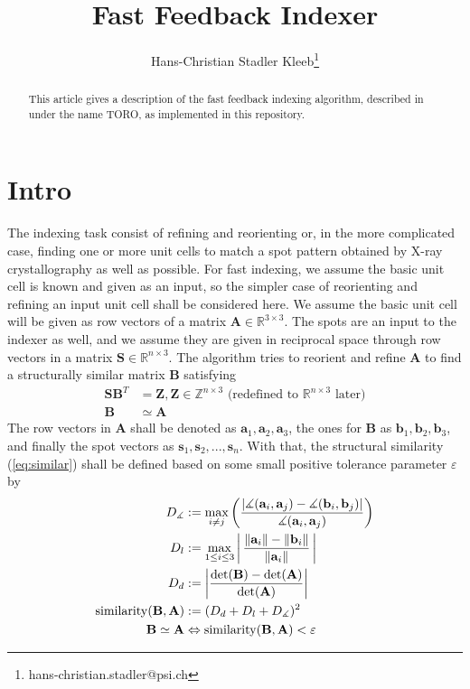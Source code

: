 \documentclass[a4paper,10pt]{article}
\title{Fast Feedback Indexer}
\author{Hans-Christian Stadler Kleeb\thanks{hans-christian.stadler@psi.ch}}
\DeclareMathOperator{\similar}{similarity}
\newcommand{\vect}[1]{\mathbf{#1}}
\newcommand{\mat}[1]{\mathbf{#1}}
\begin{document}
\maketitle

\begin{abstract}
This article gives a description of the fast feedback indexing algorithm, described in \cite{toro-indexer} under the name TORO, as implemented in this repository.
\end{abstract}

\section{Intro}\label{sec:intro}
The indexing task consist of refining and reorienting or, in the more complicated case, finding one or more unit cells to match a spot pattern obtained by X-ray crystallography as well as possible. For fast indexing, we assume the basic unit cell is known and given as an input, so the simpler case of reorienting and refining an input unit cell shall be considered here. We assume the basic unit cell will be given as row vectors of a matrix $\mat{A} \in \mathbb{R}^{3 \times 3}$. The spots are an input to the indexer as well, and we assume they are given in reciprocal space through row vectors in a matrix $\mat{S} \in \mathbb{R}^{n \times 3}$. The algorithm tries to reorient and refine $\mat{A}$ to find a structurally similar matrix $\mat{B}$ satisfying
%
\begin{align}
 \label{eq:integer} \mat{S} \mat{B}^T &= \mat{Z}, \mat{Z} \in \mathbb{Z}^{n \times 3}\text{ (redefined to }\mathbb{R}^{n\times 3}\text{ later)} \\
 \label{eq:similar} \mat{B} &\simeq \mat{A}
\end{align}
%
The row vectors in $\mat{A}$ shall be denoted as $\vect{a}_1,\vect{a}_2,\vect{a}_3$, the ones for $\mat{B}$ as $\vect{b}_1,\vect{b}_2,\vect{b}_3$, and finally the spot vectors as $\vect{s}_1, \vect{s}_2, ..., \vect{s}_n$. With that, the structural similarity (\ref{eq:similar}) shall be defined based on some small positive tolerance parameter $\varepsilon$ by
%
\begin{align}\label{eq:similarity}
  D_\measuredangle &:= \max_{i \neq j} \left (
    \frac
      {| \measuredangle(\vect{a}_i, \vect{a}_j) - \measuredangle(\vect{b}_i, \vect{b}_j) |}
      {\measuredangle(\vect{a}_i, \vect{a}_j)}
    \right ) \notag \\
  D_l &:= \max_{1 \leq i \leq 3} \left |\, \frac{\| \vect{a}_i \| - \| \vect{b}_i \|}{\| \vect{a}_i \|}\, \right | \notag \\
  D_d &:= \left | \frac{\det(\mat{B}) - \det(\mat{A})}{\det(\mat{A})} \right | \notag \\
 \similar(\mat{B}, \mat{A}) &:= ( D_d + D_l + D_\measuredangle )^2 \\
  \mat{B} \simeq \mat{A} &\Leftrightarrow \similar(\mat{B}, \mat{A}) < \varepsilon \notag
\end{align}
\end{document}
